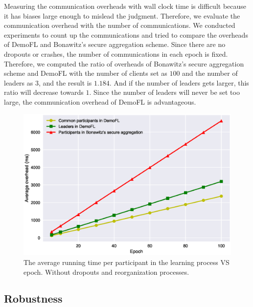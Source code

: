 Measuring the communication overheads with wall clock time is difficult because it has biases large enough to mislead the judgment. Therefore, we evaluate the communication overhead with the number of communications. We conducted experiments to count up the communications and tried to compare the overheads of DemoFL and Bonawitz's secure aggregation scheme. Since there are no dropouts or crashes, the number of communications in each epoch is fixed. Therefore, we computed the ratio of overheads of Bonawitz's secure aggregation scheme and DemoFL with the number of clients set as $100$ and the number of leaders as $3$, and the result is $1.184$. And if the number of leaders gets larger, this ratio will decrease towards $1$. Since the number of leaders will never be set too large, the communication overhead of DemoFL is advantageous.

\begin{figure}[!ht]
    \centering
    \includegraphics[width=\columnwidth]{img/learning-overhead.eps}
    \caption{The average running time per participant in the learning process VS epoch. Without dropouts and reorganization processes.}
    \label{learning-overhead}
\end{figure}

\subsection{Robustness}
